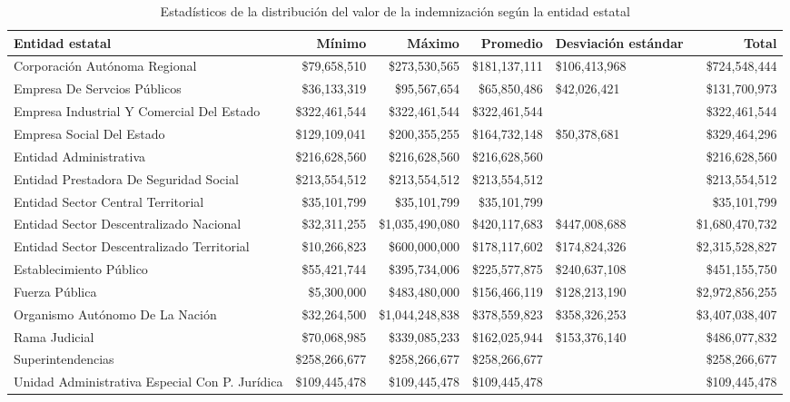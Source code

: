\begin{table}[htbp]
\centering
\caption{Estadísticos de la distribución del
valor de la indemnización según la entidad estatal} 
\label{tab:indementidad}
\begin{tabular}{p{7cm}rrrR{2cm}r}
  \hline
Entidad estatal & Mínimo & Máximo & Promedio & Desviación estándar & Total \\ 
  \hline
Corporación Autónoma Regional & \$79,658,510 & \$273,530,565 & \$181,137,111 & \$106,413,968 & \$724,548,444 \\ 
  Empresa De Servcios Públicos & \$36,133,319 & \$95,567,654 & \$65,850,486 & \$42,026,421 & \$131,700,973 \\ 
  Empresa Industrial Y Comercial Del Estado & \$322,461,544 & \$322,461,544 & \$322,461,544 &  & \$322,461,544 \\ 
  Empresa Social Del Estado & \$129,109,041 & \$200,355,255 & \$164,732,148 & \$50,378,681 & \$329,464,296 \\ 
  Entidad Administrativa & \$216,628,560 & \$216,628,560 & \$216,628,560 &  & \$216,628,560 \\ 
  Entidad Prestadora De Seguridad Social & \$213,554,512 & \$213,554,512 & \$213,554,512 &  & \$213,554,512 \\ 
  Entidad Sector Central Territorial & \$35,101,799 & \$35,101,799 & \$35,101,799 &  & \$35,101,799 \\ 
  Entidad Sector Descentralizado Nacional & \$32,311,255 & \$1,035,490,080 & \$420,117,683 & \$447,008,688 & \$1,680,470,732 \\ 
  Entidad Sector Descentralizado Territorial & \$10,266,823 & \$600,000,000 & \$178,117,602 & \$174,824,326 & \$2,315,528,827 \\ 
  Establecimiento Público & \$55,421,744 & \$395,734,006 & \$225,577,875 & \$240,637,108 & \$451,155,750 \\ 
  Fuerza Pública & \$5,300,000 & \$483,480,000 & \$156,466,119 & \$128,213,190 & \$2,972,856,255 \\ 
  Organismo Autónomo De La Nación & \$32,264,500 & \$1,044,248,838 & \$378,559,823 & \$358,326,253 & \$3,407,038,407 \\ 
  Rama Judicial & \$70,068,985 & \$339,085,233 & \$162,025,944 & \$153,376,140 & \$486,077,832 \\ 
  Superintendencias & \$258,266,677 & \$258,266,677 & \$258,266,677 &  & \$258,266,677 \\ 
  Unidad Administrativa Especial Con P. Jurídica & \$109,445,478 & \$109,445,478 & \$109,445,478 &  & \$109,445,478 \\ 
   \hline
\end{tabular}
\end{table}
